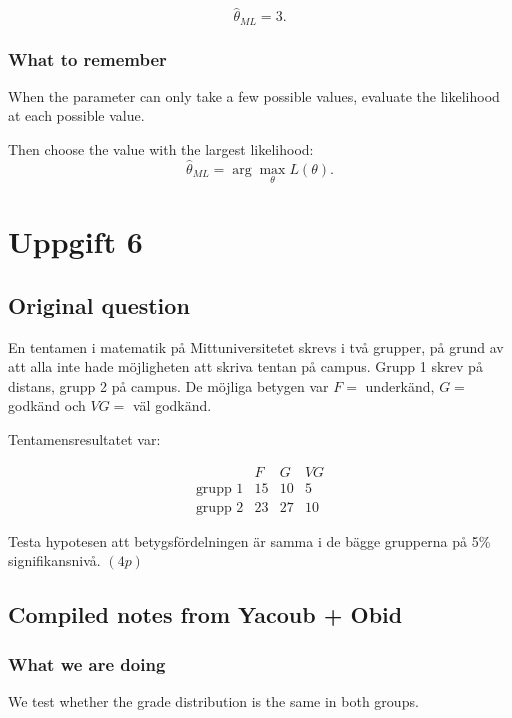 \documentclass[10pt]{article}
\begin{document}
\[
\hat{\theta}_{ML}=3.
\]

\subsubsection*{What to remember}

When the parameter can only take a few possible
values, evaluate the likelihood at each possible
value.

Then choose the value with the largest likelihood:
\[
\hat{\theta}_{ML}
=
\arg\max_{\theta} L(\theta).
\]

\section*{Uppgift 6}

\subsection*{Original question}

En tentamen i matematik på Mittuniversitetet skrevs
i två grupper, på grund av att alla inte hade
möjligheten att skriva tentan på campus. Grupp 1
skrev på distans, grupp 2 på campus. De möjliga
betygen var \(F=\) underkänd, \(G=\) godkänd och
\(VG=\) väl godkänd.

Tentamensresultatet var:

\[
\begin{array}{c|ccc}
& F & G & VG\\
\hline
\text{grupp 1} & 15 & 10 & 5\\
\text{grupp 2} & 23 & 27 & 10
\end{array}
\]

Testa hypotesen att betygsfördelningen är samma i de
bägge grupperna på 5\% signifikansnivå. \((4p)\)

\subsection*{Compiled notes from Yacoub + Obid}

\subsubsection*{What we are doing}

We test whether the grade distribution is the same
in both groups.
\end{document}
